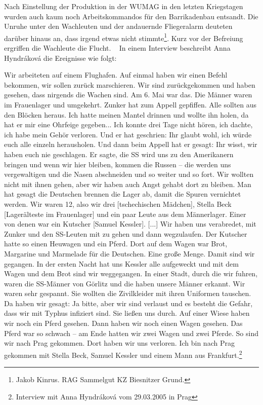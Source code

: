 \documentclass[a4paper,12pt,ngerman,
]{nisebook}
\begin{document}
Nach Einstellung der Produktion in der WUMAG in den letzten Kriegstagen wurden auch kaum noch Arbeitskommandos für den Barrikadenbau entsandt. Die Unruhe unter den Wachleuten und der andauernde Fliegeralarm deuteten darüber hinaus an, dass \glqq irgend etwas nicht stimmte\grqq\footnote{Jakob Kinrus. RAG Sammelgut KZ Biesnitzer Grund.}. Kurz vor der Befreiung ergriffen die Wachleute die Flucht.
~\newline
In einem Interview beschreibt Anna Hyndr\'akov\'a die Ereignisse wie folgt:
\begin{leftbar} 
Wir arbeiteten auf einem Flughafen. Auf einmal haben wir einen Befehl bekommen, wir sollen zurück marschieren. Wir sind zurückgekommen und haben gesehen, dass nirgends die Wachen sind. Am 6. Mai war das. Die Männer waren im Frauenlager und umgekehrt. Zunker hat zum Appell gepfiffen. Alle sollten aus den Blöcken heraus. Ich hatte meinen Mantel drinnen und wollte ihn holen, da hat er mir eine Ohrfeige gegeben... Ich konnte drei Tage nicht hören, ich dachte, ich habe mein Gehör verloren. Und er hat geschrien: \glqq Ihr glaubt wohl, ich würde euch alle einzeln herausholen\grqq. Und dann beim Appell hat er gesagt: \glqq Ihr wisst, wir haben euch nie geschlagen\grqq. Er sagte, die SS wird uns zu den Amerikanern bringen und wenn wir hier bleiben, kommen die Russen -- die werden uns vergewaltigen und die Nasen abschneiden und so weiter und so fort. Wir wollten nicht mit ihnen gehen, aber wir haben auch Angst gehabt dort zu bleiben. Man hat gesagt die Deutschen brennen die Lager ab, damit die Spuren vernichtet werden.\newline
Wir waren 12, also wir drei [tschechischen Mädchen], Stella Beck [Lagerälteste im Frauenlager] und ein paar Leute aus dem Männerlager. Einer von denen war ein Kutscher [Samuel Kessler]. [...] Wir haben uns verabredet, mit Zunker und den SS-Leuten mit zu gehen und dann wegzulaufen. Der Kutscher hatte so einen Heuwagen und ein Pferd. Dort auf dem Wagen war Brot, Margarine und Marmelade für die Deutschen. Eine große Menge. Damit sind wir gegangen. In der ersten Nacht hat uns Kessler alle aufgeweckt und mit dem Wagen und dem Brot sind wir weggegangen.\newline
In einer Stadt, durch die wir fuhren, waren die SS-Männer von Görlitz und die haben unsere Männer erkannt. Wir waren sehr gespannt. Sie wollten die Zivilkleider mit ihren Uniformen tauschen. Da haben wir gesagt: Ja bitte, aber wir sind verlaust und es besteht die Gefahr, dass wir mit Typhus infiziert sind. Sie ließen uns durch. Auf einer Wiese haben wir noch ein Pferd gesehen. Dann haben wir noch einen Wagen gesehen. Das Pferd war so schwach -- am Ende hatten wir zwei Wagen und zwei Pferde. So sind wir nach Prag gekommen. Dort haben wir uns verloren. Ich bin nach Prag gekommen mit Stella Beck, Samuel Kessler und einem Mann aus Frankfurt.\footnote{Interview mit Anna Hyndr\'akov\'a vom 29.03.2005 in Prag}
\end{leftbar}
\end{document}

